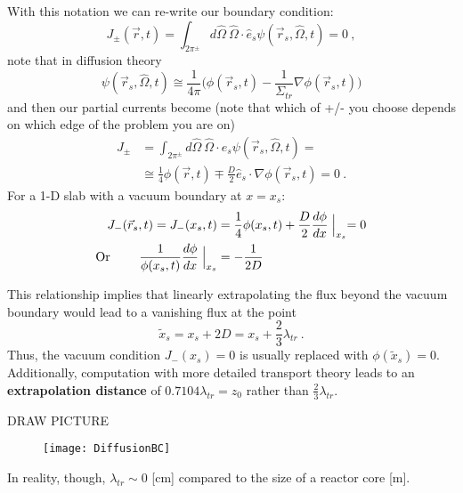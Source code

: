 \documentclass[12pt]{article}
\newcommand{\vOmega}{\ensuremath{\hat{\Omega}}}
\begin{document}
With this notation we can re-write our boundary condition:
\[J_{\pm}(\vec{r},t) = \int_{2\pi^{\pm}} d\vOmega \: \vOmega \cdot \hat{e}_s \psi(\vec{r}_s, \vOmega, t) = 0 \:,\]
note that in diffusion theory
\[\psi(\vec{r}_s, \vOmega, t) \cong \frac{1}{4\pi}\bigl(\phi(\vec{r}_s, t)  -\frac{1}{\Sigma_{tr}} \nabla \phi(\vec{r}_s, t)\bigr)\]
%
and then our partial currents become (note that which of +/- you choose depends on which edge of the problem you are on)
%
\begin{align*}
J_{\pm} &= \int_{2\pi^{\pm}} d\vOmega \: \vOmega \cdot \hat{e}_s \psi(\vec{r}_s, \vOmega, t) =\\
&\cong \frac{1}{4} \phi(\vec{r}, t) \mp \frac{D}{2} \hat{e}_s \cdot \nabla \phi(\vec{r}_s, t) = 0\:.
\end{align*} 
%
For a 1-D slab with a vacuum boundary at $x=x_s$:
%
\begin{align*}
J_{-}(\vec{r}_s, t) = J_{-}(x_s, t) &= \frac{1}{4} \phi(x_s, t) + \frac{D}{2}\frac{d \phi}{dx}\Bigm\lvert_{x_s} = 0 \\
\text{Or } \qquad \frac{1}{\phi(x_s, t)}\frac{d \phi}{dx}\Bigm\lvert_{x_s} &= -\frac{1}{2D}
\end{align*}

This relationship implies that linearly extrapolating the flux beyond the vacuum boundary would lead to a vanishing flux at the point
\[\tilde{x}_s = x_s + 2D = x_s + \frac{2}{3}\lambda_{tr}\:.\]
%
Thus, the vacuum condition $J_{-}(x_s) = 0$ is usually replaced with $\phi(\tilde{x}_s)= 0$. Additionally, computation with more detailed transport theory leads to an \textbf{extrapolation distance} of $0.7104\lambda_{tr} = z_0$ rather than $\frac{2}{3}\lambda_{tr}$. 

DRAW PICTURE
%
\begin{figure}[h!]
\begin{center}
\texttt{[image: DiffusionBC]}
\end{center}
\end{figure}

In reality, though, $\lambda_{tr} \sim 0$ [cm] compared to the size of a reactor core [m]. 


\end{document}
